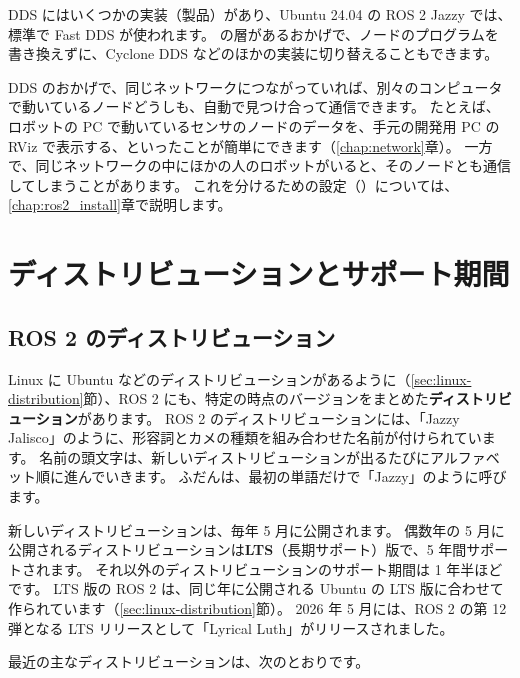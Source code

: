 DDS にはいくつかの実装（製品）があり、Ubuntu 24.04 の ROS 2 Jazzy では、標準で Fast DDS が使われます。
 の層があるおかげで、ノードのプログラムを書き換えずに、Cyclone DDS などのほかの実装に切り替えることもできます。

\begin{point}
  DDS のおかげで、同じネットワークにつながっていれば、別々のコンピュータで動いているノードどうしも、自動で見つけ合って通信できます。
  たとえば、ロボットの PC で動いているセンサのノードのデータを、手元の開発用 PC の RViz で表示する、といったことが簡単にできます（\ref{chap:network}章）。
  一方で、同じネットワークの中にほかの人のロボットがいると、そのノードとも通信してしまうことがあります。
  これを分けるための設定（）については、\ref{chap:ros2_install}章で説明します。
\end{point}

\section{ディストリビューションとサポート期間}
\label{sec:what-is-ros-distro}

\subsection{ROS 2 のディストリビューション}

Linux に Ubuntu などのディストリビューションがあるように（\ref{sec:linux-distribution}節）、ROS 2 にも、特定の時点のバージョンをまとめた\textbf{ディストリビューション}があります。
ROS 2 のディストリビューションには、「Jazzy Jalisco」のように、形容詞とカメの種類を組み合わせた名前が付けられています。
名前の頭文字は、新しいディストリビューションが出るたびにアルファベット順に進んでいきます。
ふだんは、最初の単語だけで「Jazzy」のように呼びます。

新しいディストリビューションは、毎年 5 月に公開されます。
偶数年の 5 月に公開されるディストリビューションは\textbf{LTS}（長期サポート）版で、5 年間サポートされます。
それ以外のディストリビューションのサポート期間は 1 年半ほどです。
LTS 版の ROS 2 は、同じ年に公開される Ubuntu の LTS 版に合わせて作られています（\ref{sec:linux-distribution}節）。
2026 年 5 月には、ROS 2 の第 12 弾となる LTS リリースとして「Lyrical Luth」がリリースされました。

最近の主なディストリビューションは、次のとおりです。

